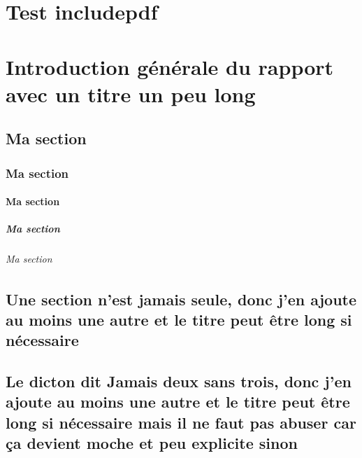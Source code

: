 \documentclass[bare]{polytech/polytech}
\begin{document}
\chapter{Test includepdf}

            

             
\chapter*[Titre court pour l'entête]{Introduction générale du rapport avec un titre un peu long}

\lipsum[1-5]
\section{Ma section}

\lipsum[1-3]

\subsection{Ma section}

\lipsum[1-3]

\subsubsection{Ma section}

\lipsum[1-3]

\paragraph{Ma section}

\lipsum[1-3]

\subparagraph{Ma section}

\lipsum[1-3]

\section{Une section n'est jamais seule, donc j'en ajoute au moins une autre et le titre peut être long si nécessaire}

\lipsum[1-3]
                       
\section{Le dicton dit \og{}Jamais deux sans trois\fg{}, donc j'en ajoute au moins une autre et le titre peut être long si nécessaire mais il ne faut pas abuser car ça devient moche et peu explicite sinon}
\end{document}
